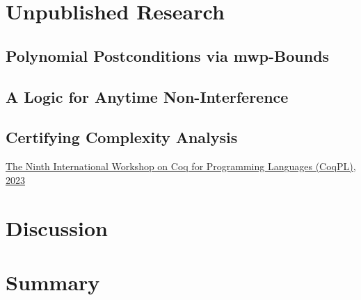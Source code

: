 \chapter{Unpublished Research}\label{ch:unpublished-research}
\clearpage

    \section{Polynomial Postconditions via mwp-Bounds}\label{sec:postcond}
    \pageIconFm
    \clearpage
    
    \clearpage

    \section{A Logic for Anytime Non-Interference}\label{sec:anytime}
    \pageIconSecurity
    \clearpage
    
    \clearpage

    \section{Certifying Complexity Analysis}\label{certcpx}
    \pageIconFm
    \ainfo{\CTNT}
    {\href{https://popl23.sigplan.org/home/CoqPL-2023}
    {The Ninth International Workshop on Coq for Programming Languages (CoqPL), 2023}}
    \clearpage
    
    \clearpage

\chapter{Discussion}\label{ch:discussion}


\chapter{Summary}\label{ch:summary}


